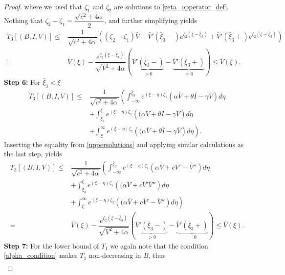 \documentclass[11pt]{article}
\theoremstyle{definition}
\begin{document}
{\begin{proof}
where we used that $\zeta_1$ and $\zeta_2$ are solutions to \eqref{zeta_opperator_def}. Nothing that $\zeta_2-\zeta_1=\dfrac{\sqrt{c^2+4\alpha}}{2}$, and further simplifying yields 
\begin{align}
     T_3[(B,I,V)] \le & \dfrac{1}{\sqrt{c^2+4 \alpha}} \left( (\zeta_2-\zeta_1 ) \bar{V} - \bar{V}'(\bar{\xi}_3-)e^{\zeta_2(\xi - \bar{\xi}_3)}+  \bar{V}'(\bar{\xi}_3+)e^{\zeta_2(\xi - \bar{\xi}_3)} \right) \\ =& \bar{V}(\xi) -\dfrac{e^{\zeta_2(\xi- \bar{\xi}_1)}}{\sqrt{V^2+4\alpha}}\left(\underbrace{\bar{V}'(\bar{\xi}_3-)}_{>0} - \underbrace{\bar{V}'(\bar{\xi}_3+)}_{=0} \right) \le \bar{V}(\xi).
     \end{align}
                \textbf{Step 6:} For $\bar{\xi}_3< \xi$\begin{align}
        T_3[(B,I,V)] \le & \dfrac{1}{\sqrt{c^2+4 \alpha}} \left( \int_{-\infty}^{\bar{\xi}_3} e^{(\xi- \eta)\zeta_1} {\left(\alpha \bar V+\theta\bar I-\gamma\bar V \right)}d \eta \right. \\ & + \left. \int_{\bar{\xi}_3}^{\xi} e^{(\xi- \eta)\zeta_1} {\left((\alpha \bar V+\theta\bar I-\gamma\bar V \right)}d \eta \right. \\&+ \left. \int_{\xi}^{\infty} e^{(\xi- \eta)\zeta_2} {\left((\alpha \bar V+\theta\bar I-\gamma\bar V \right)}d \eta \right).
    \end{align}
    Inserting the equality from \eqref{uppersolutions} and applying similar calculations as the last step, yields
    \begin{align}
          T_3[(B,I,V)] \le & \dfrac{1}{\sqrt{c^2+4 \alpha}} \left( \int_{-\infty}^{\bar\xi_3} e^{(\xi- \eta)\zeta_1} {\left(\alpha \bar V+ c\bar V'-\bar V'' \right)}d \eta \right. \\ & + \left. \int_{\bar\xi_3}^{{\xi}} e^{(\xi- \eta)\zeta_1} {\left((\alpha \bar V+ c\bar V' \bar V'' \right)}d \eta \right. \\&+ \left. \int_{\xi}^{\infty} e^{(\xi- \eta)\zeta_2} {\left((\alpha \bar V+ c\bar V'-\bar V'' \right)}d \eta \right)\\ =& \bar{V}(\xi) - \dfrac{e^{\zeta_2(\xi- \bar{\xi}_3)}}{\sqrt{V^2+4 \alpha}}\left(\underbrace{\bar{V}'(\bar{\xi}_3-)}_{>0} - \underbrace{\bar{V}'(\bar{\xi}_3+)}_{=0} \right) \le \bar{V}(\xi).
    \end{align}
\noindent\textbf{Step 7:} For the lower bound of $T_1$ we again note that the condition \eqref{alpha_condition} makes $T_1$ non-decreasing in $B$, thus  
 \begin{align}

\end{align}
\end{proof}}
\end{document}
